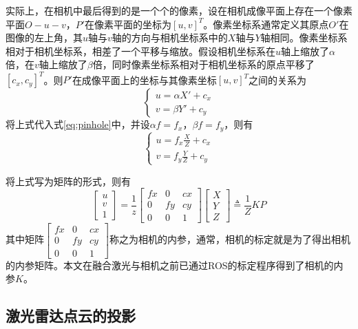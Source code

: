 实际上，在相机中最后得到的是一个个的像素，设在相机成像平面上存在一个像素平面$O-u-v$，$P'$在像素平面的坐标为$[u,v]^T$。像素坐标系通常定义其原点$O'$在图像的左上角，其$u$轴与$v$轴的方向与相机坐标系中的$X$轴与$Y$轴相同。像素坐标系相对于相机坐标系，相差了一个平移与缩放。假设相机坐标系在$u$轴上缩放了$\alpha$倍，在$v$轴上缩放了$\beta$倍，同时像素坐标系相对于相机坐标系的原点平移了$[c_x, c_y]^T$。则$P'$在成像平面上的坐标与其像素坐标$[u,v]^T$之间的关系为
\begin{equation}
    \left\{
        \begin{split}
            u = \alpha X' + c_x \\
            v = \beta Y' + c_y
        \end{split}
    \right.
\end{equation}
将上式代入式\ref{eq:pinhole}中，并设$\alpha f = f_x$，$\beta f = f_y$，则有
\begin{equation}
    \left\{
        \begin{split}
            u = f_x \frac{X}{Z} + c_x \\
            v = f_y \frac{Y}{Z} + c_y
        \end{split}
    \right.
\end{equation}

将上式写为矩阵的形式，则有
\begin{equation}
    \begin{bmatrix} u \\ v \\ 1
    \end{bmatrix}
    = \frac{1}{z} \begin{bmatrix} fx & 0 & cx \\ 0 & fy & cy \\ 0 & 0 &1 
    \end{bmatrix}
    \begin{bmatrix} X \\ Y \\ Z
    \end{bmatrix}
    \triangleq \frac{1}{Z}KP
\end{equation}
其中矩阵$\begin{bmatrix} fx & 0 & cx \\ 0 & fy & cy \\ 0 & 0 &1 
\end{bmatrix}$称之为相机的内参，通常，相机的标定就是为了得出相机的内参矩阵。本文在融合激光与相机之前已通过ROS的标定程序得到了相机的内参$K$。

\subsection{激光雷达点云的投影}

